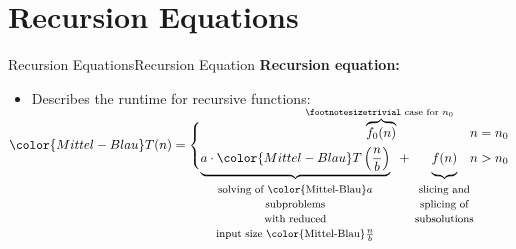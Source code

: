 \section{Recursion Equations}

\begin{frame}{Recursion Equations}{Recursion Equation}
  \textbf{Recursion equation:}
  \begin{itemize}
    \item
      Describes the runtime for recursive functions:
  \end{itemize}
  \vspace{2em}
  \begin{displaymath}
    {\color{Mittel-Blau}T(n)} =
    \begin{cases}
      \hfill
      \smash{
        \overbrace{f_0(n)}^\text{%
          \footnotesize%
          trivial case for $n_0$
        }
      }
      \vphantom{f_0(n)} & n = n_0\\[0.5em]
      \smash{
        \underbrace{
          a \cdot {\color{Mittel-Blau}T\left(\frac{n}{b}\right)}
        }_\text{
          \footnotesize%
          \begin{tabular}{c}
            \text{solving of {\color{Mittel-Blau}$a$}}\\
            \text{subproblems}\\
            \text{with reduced}\\
            \text{input size {\color{Mittel-Blau}$\frac{n}{b}$}}
          \end{tabular}
        }
      } \hspace{0.5em} + \hspace{1.5em}
      \smash{
        \underbrace{
          f(n)
          \vphantom{\left(\frac{n}{b}\right)}
        }_\text{
          \makebox[0pt][c]{
            \footnotesize%
            \begin{tabular}{c}
              slicing and\\
              splicing of\\
              subsolutions
            \end{tabular}
          }
        }
      }
      \vphantom{\left(\frac{n}{b}\right)}
      &n > n_0
    \end{cases}
  \end{displaymath}
  \vspace{4em}
\end{frame}


